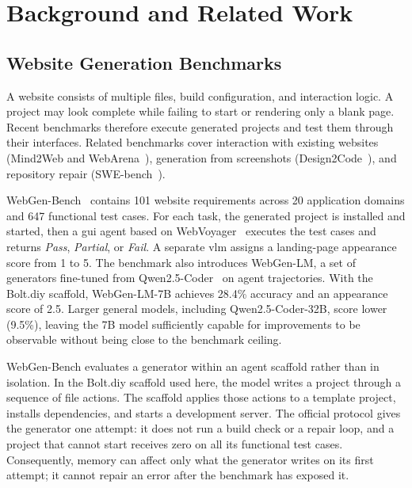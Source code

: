 \chapter{Background and Related Work}
\label{chap:background}



\section{Website Generation Benchmarks}
\label{sec:bg-webgen}
A website consists of multiple files, build configuration, and interaction logic. A project may look complete while failing to start or rendering only a blank page. Recent benchmarks therefore execute generated projects and test them through their interfaces. Related benchmarks cover interaction with existing websites (Mind2Web and WebArena~\cite{deng2023mind2web,zhou2024webarena}), generation from screenshots (Design2Code~\cite{si2024design2code}), and repository repair (SWE-bench~\cite{jimenez2024swebench}).

WebGen-Bench~\cite{lu2025webgenbench} contains 101 website requirements across 20 application domains and 647 functional test cases. For each task, the generated project is installed and started, then a \gls{gui} agent based on WebVoyager~\cite{he2024webvoyager} executes the test cases and returns \emph{Pass}, \emph{Partial}, or \emph{Fail}. A separate \gls{vlm} assigns a landing-page appearance score from 1 to 5. The benchmark also introduces WebGen-LM, a set of generators fine-tuned from Qwen2.5-Coder~\cite{hui2024qwencoder} on agent trajectories. With the Bolt.diy scaffold, WebGen-LM-7B achieves 28.4\% accuracy and an appearance score of 2.5. Larger general models, including Qwen2.5-Coder-32B, score lower (9.5\%), leaving the 7B model sufficiently capable for improvements to be observable without being close to the benchmark ceiling.

WebGen-Bench evaluates a generator within an agent scaffold rather than in isolation. In the Bolt.diy scaffold used here, the model writes a project through a sequence of file actions. The scaffold applies those actions to a template project, installs dependencies, and starts a development server. The official protocol gives the generator one attempt: it does not run a build check or a repair loop, and a project that cannot start receives zero on all its functional test cases. Consequently, memory can affect only what the generator writes on its first attempt; it cannot repair an error after the benchmark has exposed it.

